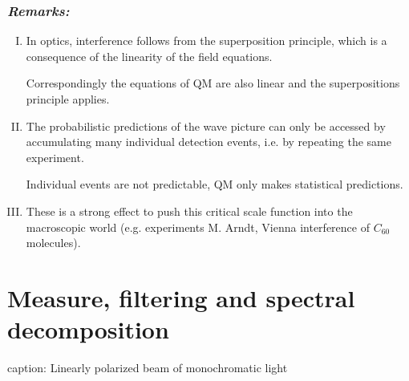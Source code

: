 \subsubsection*{\emph{Remarks:}}

\begin{enumerate}[I)]
	\item In optics, interference follows from the superposition principle, which is a consequence of the linearity of the field equations.\par
	Correspondingly the equations of QM are also linear and the superpositions principle applies.
	\item The probabilistic predictions of the wave picture can only be accessed by accumulating many individual detection events, i.e. by repeating the same experiment.\par
	Individual events are not predictable, QM only makes statistical predictions.
	\item These is a strong effect to push this critical scale function into the macroscopic world (e.g. experiments M. Arndt, Vienna interference of $ C_{60} $ molecules).
\end{enumerate}

\section{Measure, filtering and spectral decomposition}

\noindent
\hft
caption: Linearly polarized beam of monochromatic light\\[10pt]

